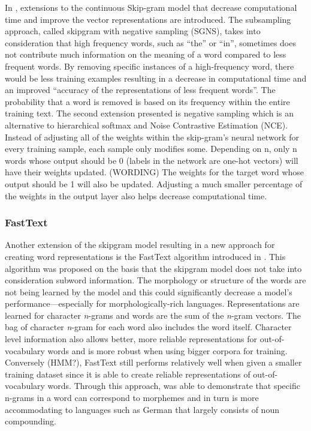 In \citet{mikolov2013distributed}, extensions to the continuous Skip-gram model that decrease computational time and improve the vector representations are introduced. The subsampling approach, called skipgram with negative sampling (SGNS), takes into consideration that high frequency words, such as “the” or “in”, sometimes does not contribute much information on the meaning of a word compared to less frequent words. By removing specific instances of a high-frequency word, there would be less training examples resulting in a decrease in computational time and an improved “accuracy of the representations of less frequent words”. \citep{mikolov2013distributed} The probability that a word is removed is based on its frequency within the entire training text. The second extension presented is negative sampling which is an alternative to hierarchical softmax and Noise Contrastive Estimation (NCE). Instead of adjusting all of the weights within the skip-gram’s neural network for every training sample, each sample only modifies some. Depending on n, only n words whose output should be 0 (labels in the network are one-hot vectors) will have their weights updated. (WORDING) The weights for the target word whose output should be 1 will also be updated. Adjusting a much smaller percentage of the weights in the output layer also helps decrease computational time.

\subsubsection{FastText}
Another extension of the skipgram model resulting in a new approach for creating word representations is the FastText algorithm introduced in \citet{bojanowski2017enriching}. This algorithm was proposed on the basis that the skipgram model does not take into consideration subword information. The morphology or structure of the words are not being learned by the model and this could significantly decrease a model’s performance—especially for morphologically-rich languages. Representations are learned for character \emph{n}-grams and words are the sum of the \emph{n}-gram vectors. The bag of character \emph{n}-gram for each word also includes the word itself. Character level information also allows better, more reliable representations for out-of-vocabulary words and is more robust when using bigger corpora for training. Conversely (HMM?), FastText still performs relatively well when given a smaller training dataset since it is able to create reliable representations of out-of-vocabulary words. Through this approach, \citet{bojanowski2017enriching} was able to demonstrate that specific n-grams in a word can correspond to morphemes and in turn is more accommodating to languages such as German that largely consists of noun compounding. 
